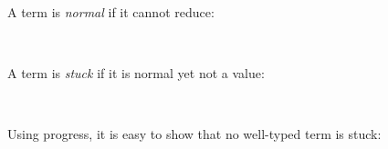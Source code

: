 A term is \emph{normal} if it cannot reduce:

\begin{fence}
\begin{code}%
\>[0]\AgdaSpace{}%
\AgdaSymbol{:}\AgdaSpace{}%
\AgdaSpace{}%
\AgdaSpace{}%
\<%
\\
\>[0]\AgdaSpace{}%
%
\>[10]\AgdaSymbol{=}%
\>[13]\AgdaSpace{}%
\AgdaSymbol{\{}\AgdaSymbol{\}}\AgdaSpace{}%
\AgdaSpace{}%
\AgdaSpace{}%
\AgdaSymbol{(}\AgdaSpace{}%
\AgdaSpace{}%
\AgdaSymbol{)}\<%
\end{code}
\end{fence}

A term is \emph{stuck} if it is normal yet not a value:

\begin{fence}
\begin{code}%
\>[0]\AgdaSpace{}%
\AgdaSymbol{:}\AgdaSpace{}%
\AgdaSpace{}%
\AgdaSpace{}%
\<%
\\
\>[0]\AgdaSpace{}%
%
\>[9]\AgdaSymbol{=}%
\>[12]\AgdaSpace{}%
\AgdaSpace{}%
\AgdaSpace{}%
\AgdaSpace{}%
\AgdaSpace{}%
\<%
\end{code}
\end{fence}

Using progress, it is easy to show that no well-typed term is stuck:

\begin{fence}
\begin{code}%
\>[0]\<%
\\
\>[0][@{}l@{\AgdaIndent{0}}]%
\>[2]\AgdaSpace{}%
\AgdaSymbol{:}\AgdaSpace{}%
\AgdaSpace{}%
\AgdaSymbol{\{}\AgdaSpace{}%
\AgdaSymbol{\}}\<%
\\
\>[2][@{}l@{\AgdaIndent{0}}]%
\>[4]%
\>[2298I]\AgdaSpace{}%
\AgdaSpace{}%
\AgdaSpace{}%
\AgdaSpace{}%
\<%
\\
\>[.][@{}l@{}]\<[2298I]%
\>[6]\AgdaComment{-----------}\<%
\\
%
\>[4]\AgdaSpace{}%
\AgdaSpace{}%
\AgdaSymbol{(}\AgdaSpace{}%
\AgdaSymbol{)}\<%
\end{code}
\end{fence}

